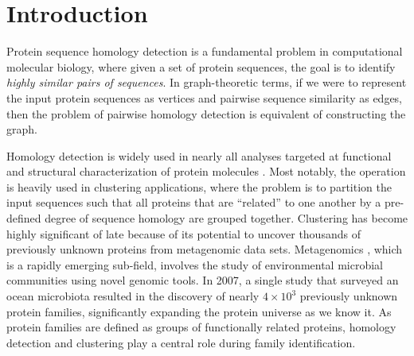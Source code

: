 \documentclass[10pt,journal,letterpaper,compsoc]{IEEEtran}
\begin{document}
\maketitle

%
\IEEEpeerreviewmaketitle

\section{Introduction}
\label{secIntroduction}

Protein sequence homology detection is a fundamental problem in computational molecular biology, where given a set of protein sequences, the goal is to identify \emph{highly similar pairs of sequences}. In graph-theoretic terms, if we were to represent the input protein sequences as vertices and pairwise sequence similarity as edges, then the problem of pairwise homology detection is equivalent of constructing the graph. 

Homology detection is widely used in nearly all analyses targeted at functional and structural characterization of protein molecules \cite{Kriventseva01}. Most notably, the operation is heavily used in clustering applications, where the problem is to partition the input sequences such that all proteins that are ``related'' to one another by a pre-defined degree of sequence homology are grouped together. 
Clustering has become highly significant of late because of its potential to uncover thousands of previously unknown proteins from metagenomic data sets. Metagenomics \cite{Handelsman04}, which is a rapidly emerging sub-field, involves the study of environmental microbial communities using novel genomic tools. In 2007, a single study that surveyed an ocean microbiota \cite{Yooseph07} resulted in the discovery of nearly $4\times 10^3$ previously unknown protein families, significantly expanding the protein universe as we know it. As protein families are defined as groups of functionally related proteins, homology detection and clustering play a central role during family identification. 
\end{document}
